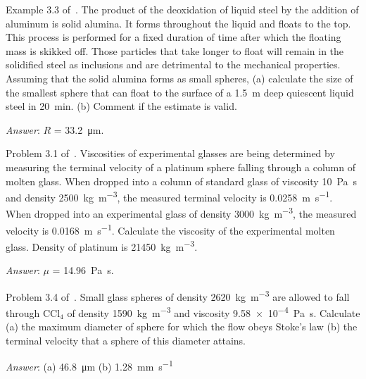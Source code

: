 
\begin{question}
Example 3.3 of~\cite{gaskell}. The product of the deoxidation of liquid steel by the addition of aluminum is solid alumina. It forms throughout the liquid and floats to the top. This process is performed for a fixed duration of time after which the floating mass is skikked off. Those particles that take longer to float will remain in the solidified steel as inclusions and are detrimental to the mechanical properties. Assuming that the solid alumina forms as small spheres, (a) calculate the size of the smallest sphere that can float to the surface of a \SI{1.5}{\metre} deep quiescent liquid steel in \SI{20}{\minute}. (b) Comment if the estimate is valid.\\ 
\end{question}
\begin{solution}[print]
{\it Answer}: $R$ = \SI{33.2}{\micro\metre}.
\end{solution}

\begin{question}
Problem 3.1 of~\cite{gaskell}. Viscosities of experimental glasses are being determined by measuring the terminal velocity of a platinum sphere falling through a column of molten glass. When dropped into a column of standard glass of viscosity \SI{10}{\pascal\second} and density \SI{2500}{\kilo\gram\per\metre\cubed}, the measured terminal velocity is \SI{0.0258}{ \metre\per\second}. When dropped into an experimental glass of density \SI{3000}{\kilo\gram\per\metre\cubed}, the measured velocity is \SI{0.0168}{ \metre\per\second}. Calculate the viscosity of the experimental molten glass. Density of platinum is \SI{21450}{\kilo\gram\per\metre\cubed}.
\end{question}
\begin{solution}[print]
{\it Answer}: $\mu$ = \SI{14.96}{\pascal\second}.
\end{solution}

\begin{question}
Problem 3.4 of~\cite{gaskell}. Small glass spheres of density \SI{2620}{\kilo\gram\per\metre\cubed} are allowed to fall through $\mathrm{CCl_4}$ of density \SI{1590}{\kilo\gram\per\metre\cubed} and viscosity \SI{9.58e-4}{\pascal\second}. Calculate (a) the maximum diameter of sphere for which the flow obeys Stoke's law (b) the terminal velocity that a sphere of this diameter attains. 
\end{question}
\begin{solution}[print]
{\it Answer}: (a) \SI{46.8}{\micro\metre} (b) \SI{1.28}{\milli\metre\per\second}
\end{solution}


